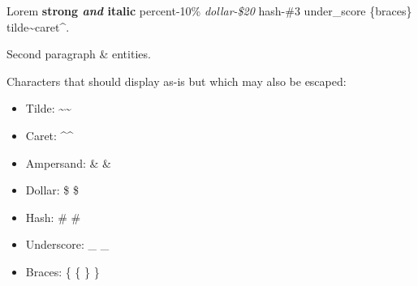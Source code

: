 Lorem \textbf{strong \emph{and} italic} percent-10\% \emph{dollar-\$20} hash-\#3 under\_score \{braces\} tilde\textasciitilde caret\textasciicircum.

Second paragraph \& entities.

Characters that should display as-is but which may also be escaped:

\begin{itemize}
\item Tilde: \textasciitilde \textasciitilde{}
\item Caret: \textasciicircum \textasciicircum{}
\item Ampersand: \& \&
\item Dollar: \$ \$
\item Hash: \# \#
\item Underscore: \_ \_
\item Braces: \{ \{ \} \}
\end{itemize}

